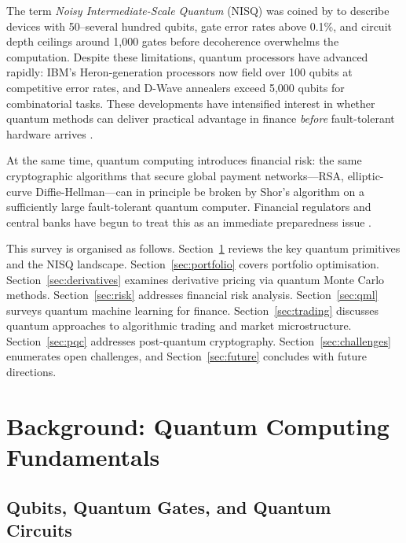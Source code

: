 \documentclass[12pt,a4paper]{article}
\begin{document}
The term \emph{Noisy Intermediate-Scale Quantum} (NISQ) was coined by \citet{preskill_quantum_2018} to describe devices with 50--several hundred qubits, gate error rates above 0.1\%, and circuit depth ceilings around 1{,}000 gates before decoherence overwhelms the computation. Despite these limitations, quantum processors have advanced rapidly: IBM's Heron-generation processors now field over 100 qubits at competitive error rates, and D-Wave annealers exceed 5{,}000 qubits for combinatorial tasks. These developments have intensified interest in whether quantum methods can deliver practical advantage in finance \emph{before} fault-tolerant hardware arrives \citep{gong_quantum_2026-1, reznikov_how_nodate, soller_quantum_nodate}.

At the same time, quantum computing introduces financial risk: the same cryptographic algorithms that secure global payment networks---RSA, elliptic-curve Diffie-Hellman---can in principle be broken by Shor's algorithm on a sufficiently large fault-tolerant quantum computer. Financial regulators and central banks have begun to treat this as an immediate preparedness issue \citep{auer_quantum_2024, hollebeek_impact_nodate}.

This survey is organised as follows. Section~\ref{sec:background} reviews the key quantum primitives and the NISQ landscape. Section~\ref{sec:portfolio} covers portfolio optimisation. Section~\ref{sec:derivatives} examines derivative pricing via quantum Monte Carlo methods. Section~\ref{sec:risk} addresses financial risk analysis. Section~\ref{sec:qml} surveys quantum machine learning for finance. Section~\ref{sec:trading} discusses quantum approaches to algorithmic trading and market microstructure. Section~\ref{sec:pqc} addresses post-quantum cryptography. Section~\ref{sec:challenges} enumerates open challenges, and Section~\ref{sec:future} concludes with future directions.

\section{Background: Quantum Computing Fundamentals}
\label{sec:background}

\subsection{Qubits, Quantum Gates, and Quantum Circuits}
\end{document}
